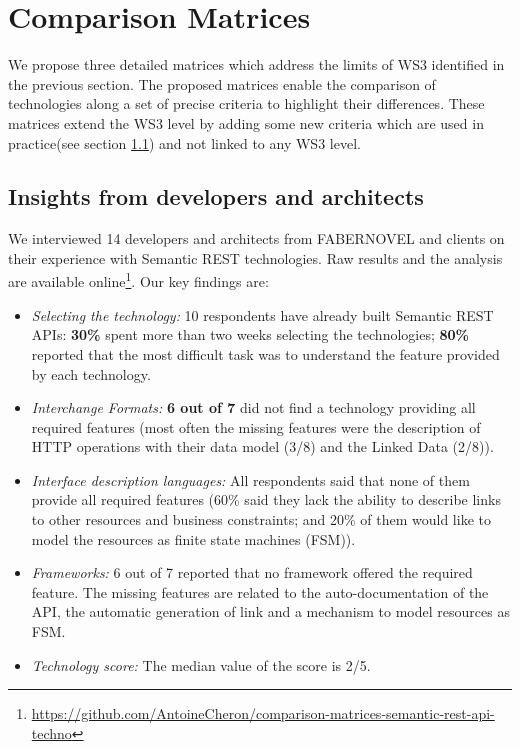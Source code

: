 \vspace*{-0.5cm}
\section{Comparison Matrices}\label{sec:matrix}

\vspace*{-0.3cm}
We propose three detailed matrices which address the limits of WS3 identified in the previous section. 
The proposed matrices enable the comparison of technologies along a set of precise criteria to highlight their differences. 
These matrices extend the WS3 level by adding some new criteria which are used in practice(see section \ref{sec:insight}) and not linked to any WS3 level.

\vspace*{-0.2cm}
\subsection{Insights from developers and architects}\label{sec:insight}

We interviewed 14 developers and architects from FABERNOVEL and clients on their experience with Semantic REST technologies. Raw results and the analysis are available online\footnote{\url{https://github.com/AntoineCheron/comparison-matrices-semantic-rest-api-techno}}. Our key findings are:
\begin{itemize}
 \item \textit{Selecting the technology:} 10 respondents have already built Semantic REST APIs: \textbf{30\%} spent more than two weeks selecting the technologies; \textbf{80\%} reported that the most difficult task was to understand the feature provided by each technology.
 \item \textit{Interchange Formats:} \textbf{6 out of 7} did not find a technology providing all required features (most often the missing features were the description of HTTP operations with their data model (3/8) and the Linked Data (2/8)). 
 \item \textit{Interface description languages:} All respondents said that none of them provide all required features (60\% said they lack the ability to describe links to other resources and business constraints; and 20\% of them would like to model the resources as finite state machines (FSM)).
 \item \textit{Frameworks:} 6 out of 7 reported that no framework offered the required feature. The missing features are related to the auto-documentation of the API, the automatic generation of link and a mechanism to model resources as FSM.
 \item \textit{Technology score:} The median value of the score is 2/5.
\end{itemize}

